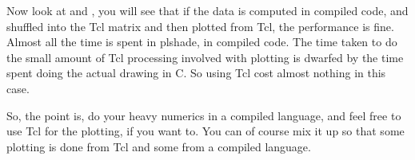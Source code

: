 Now look at  and , you will see
that if the data is computed in compiled code, and shuffled into the
Tcl matrix and then plotted from Tcl, the performance is fine.  Almost
all the time is spent in plshade, in compiled code.  The time taken to
do the small amount of Tcl processing involved with plotting is
dwarfed by the time spent doing the actual drawing in C.  So using Tcl
cost almost nothing in this case.

So, the point is, do your heavy numerics in a compiled language, and
feel free to use Tcl for the plotting, if you want to.  You can of
course mix it up so that some plotting is done from Tcl and some from
a compiled language.  